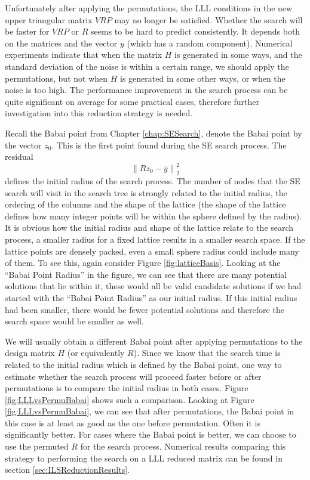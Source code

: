 \documentclass[12pt,Bold,letterpaper]{mcgilletdclass}
\begin{document}
Unfortunately after applying the permutations, the LLL
conditions in the new upper triangular matrix $VRP$ may no longer be satisfied.
Whether the search will be faster for $VRP$ or $R$ seems to be hard to predict
consistently. It depends both on the matrices and the vector $y$ (which has a
random component). Numerical experiments indicate that when the matrix $H$ is
generated in some ways, and the standard deviation of the noise is within a
certain range, we should apply the permutations, but not when $H$ is generated
in some other ways, or when the noise is too high. The performance improvement
in the search process can be quite significant on average for some practical
cases, therefore further investigation into this reduction strategy is needed.

Recall the Babai point from Chapter \ref{chap:SESearch}, denote the Babai point by the vector $z_0$. This is the first point found during the SE search process. The residual $$\left \| Rz_0 - \bar{y} \right \|^2_2$$ defines the initial radius of the search process. The number of nodes that the SE search will visit in the search tree is strongly related to the initial radius, the ordering of the columns and the shape of the lattice (the shape of the lattice defines how many integer points will be within the sphere defined by the radius). It is obvious how the initial radius and shape of the lattice relate to the search process, a smaller radius for a fixed lattice results in a smaller search space. If the lattice points are densely packed, even a small sphere radius could include many of them. To see this, again consider Figure \ref{fig:latticeBasis}. Looking at the ``Babai Point Radius'' in the figure, we can see that there are many potential solutions that lie within it, these would all be valid candidate solutions if we had started with the ``Babai Point Radius'' as our initial radius. If this initial radius had been smaller, there would be fewer potential solutions and therefore the search space would be smaller as well.

We will usually obtain a different Babai point after applying permutations to
the design matrix $H$ (or equivalently $R$). Since we know that the search time
is related to the initial radius which is defined by the Babai point, one way to
estimate whether the search process will proceed faster before or after
permutations is to compare the initial radius in both cases. Figure
\ref{fig:LLLvsPermuBabai} shows such a comparison. Looking at Figure
\ref{fig:LLLvsPermuBabai}, we can see that after permutations, the Babai point
in this case is at least as good as the one before permutation. Often it is
significantly better. For cases where the Babai point is better, we can choose
to use the permuted $R$ for the search process. Numerical results comparing this
strategy to performing the search on a LLL reduced matrix can be found in
section \ref{sec:ILSReductionResults}.
\end{document}
